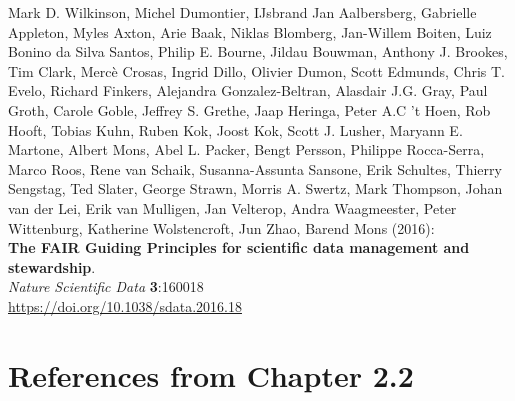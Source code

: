 \begin{thebibliography}{9}
Mark D. Wilkinson, Michel Dumontier, IJsbrand Jan
Aalbersberg, Gabrielle Appleton, Myles Axton, Arie Baak, Niklas
Blomberg, Jan-Willem Boiten, Luiz Bonino da Silva Santos, Philip E.
Bourne, Jildau Bouwman, Anthony J. Brookes, Tim Clark, Mercè Crosas,
Ingrid Dillo, Olivier Dumon, Scott Edmunds, Chris T. Evelo, Richard
Finkers, Alejandra Gonzalez-Beltran, Alasdair J.G. Gray, Paul Groth,
Carole Goble, Jeffrey S. Grethe, Jaap Heringa, Peter A.C 't Hoen, Rob
Hooft, Tobias Kuhn, Ruben Kok, Joost Kok, Scott J. Lusher, Maryann E.
Martone, Albert Mons, Abel L. Packer, Bengt Persson, Philippe
Rocca-Serra, Marco Roos, Rene van Schaik, Susanna-Assunta Sansone, Erik
Schultes, Thierry Sengstag, Ted Slater, George Strawn, Morris A. Swertz,
Mark Thompson, Johan van der Lei, Erik van Mulligen, Jan Velterop, Andra
Waagmeester, Peter Wittenburg, Katherine Wolstencroft, Jun Zhao, Barend
Mons (2016):\\
\textbf{The FAIR Guiding Principles for scientific data management and
stewardship}.\\
\emph{Nature Scientific Data} \textbf{3}:160018\\
\url{https://doi.org/10.1038/sdata.2016.18}


\section{References from Chapter 2.2}


\end{thebibliography}
